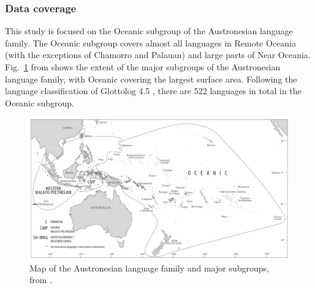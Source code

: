 \documentclass[12pt,letterpaper]{article}
\begin{document}

\FloatBarrier
\subsubsection{Data coverage} 
This study is focused on the Oceanic subgroup of the Austronesian language family. The Oceanic subgroup covers almost all languages in Remote Oceania (with the exceptions of Chamorro and Palauan) and large parts of Near Oceania. Fig.~\ref{Oceanic_map} from \citet[2]{protooceanicvol5} shows the extent of the major subgroups of the Austronesian language family, with Oceanic covering the largest surface area. Following the language classification of Glottolog 4.5 \citep{glottolog4_5}, there are 522 languages in total in the Oceanic subgroup.

\begin{figure}[ht]
\centering
\includegraphics[width=\textwidth]{illustrations/ross_pawley_osmond_protooceanic_vol5.png}
\caption{{Map of the Austronesian language family and major subgroups, from \citet[2]{protooceanicvol5}.}}
\label{Oceanic_map}
\end{figure} 
\end{document}
